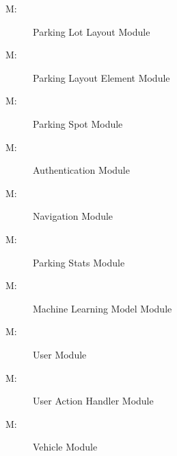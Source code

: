 \documentclass[12pt, titlepage]{article}
\newcounter{mnum}
\newcommand{\mthemnum}{M\themnum}
\begin{document}
\begin{description}
\item [ \mthemnum \label{mParkingLotLayout}:] Parking Lot
Layout Module
\end{description}

\begin{description}
\item [ \mthemnum \label{mParkingLayoutElem}:] Parking
Layout Element Module
\end{description}

\begin{description}
\item [ \mthemnum \label{mParkingSpot}:] Parking Spot
Module
\end{description}

\begin{description}
\item [ \mthemnum \label{mAuthentication}:] Authentication
Module
\end{description}

\begin{description}
\item [ \mthemnum \label{mNavigation}:] Navigation Module
\end{description}

\begin{description}
\item [ \mthemnum \label{mParkingStats}:] Parking Stats
Module
\end{description}

\begin{description}
\item [ \mthemnum \label{mMachineLearningModel}:] Machine
Learning Model Module
\end{description}

\begin{description}
\item [ \mthemnum \label{mUser}:] User Module
\end{description}

\begin{description}
\item [ \mthemnum \label{mUserActionHandler}:] User Action
Handler Module
\end{description}

\begin{description}
\item [ \mthemnum \label{mVehicle}:] Vehicle Module
\end{description}
\end{document}

